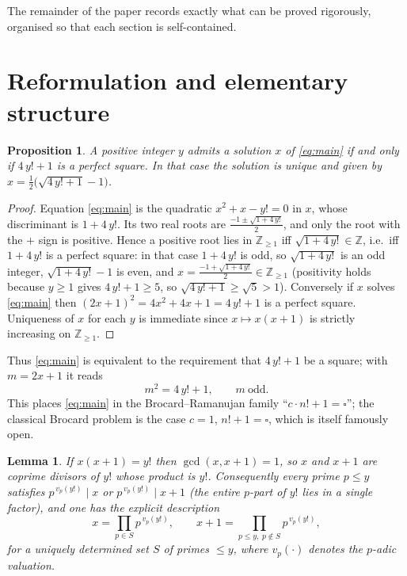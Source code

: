 \documentclass{amsart}
\theoremstyle{plain}
\newtheorem{proposition}{Proposition}
\newtheorem{lemma}{Lemma}
\theoremstyle{remark}
\begin{document}
The remainder of the paper records exactly what can be proved rigorously,
organised so that each section is self-contained.

\section{Reformulation and elementary structure}

\begin{proposition}\label{prop:square}
A positive integer $y$ admits a solution $x$ of \eqref{eq:main} if and only
if $4\,y!+1$ is a perfect square.  In that case the solution is unique and
given by $x=\tfrac{1}{2}\bigl(\sqrt{4\,y!+1}-1\bigr)$.
\end{proposition}

\begin{proof}
Equation \eqref{eq:main} is the quadratic $x^2+x-y!=0$ in $x$, whose
discriminant is $1+4\,y!$.  Its two real roots are
$\frac{-1\pm\sqrt{1+4\,y!}}{2}$, and only the root with the $+$ sign is
positive.  Hence a positive root lies in $\mathbb{Z}_{\ge1}$ iff
$\sqrt{1+4\,y!}\in\mathbb{Z}$, i.e.\ iff $1+4\,y!$ is a perfect square: in
that case $1+4\,y!$ is odd, so $\sqrt{1+4\,y!}$ is an odd integer,
$\sqrt{1+4\,y!}-1$ is even, and
$x=\frac{-1+\sqrt{1+4\,y!}}{2}\in\mathbb{Z}_{\ge 1}$ (positivity holds
because $y\ge1$ gives $4\,y!+1\ge5$, so $\sqrt{4\,y!+1}\ge\sqrt5>1$).
Conversely if $x$ solves \eqref{eq:main} then
$(2x+1)^2=4x^2+4x+1=4\,y!+1$ is a perfect square. Uniqueness of $x$ for each
$y$ is immediate since $x\mapsto x(x+1)$ is strictly increasing on
$\mathbb{Z}_{\ge 1}$.
\end{proof}

Thus \eqref{eq:main} is equivalent to the requirement that $4\,y!+1$ be a
square; with $m=2x+1$ it reads
\begin{equation}\label{eq:m}
   m^2=4\,y!+1,\qquad m\ \text{odd}.
\end{equation}
This places \eqref{eq:main} in the Brocard--Ramanujan family
``$c\cdot n!+1=\square$''; the classical Brocard problem is the case
$c=1$, $n!+1=\square$, which is itself famously open.

\begin{lemma}\label{lem:coprime}
If $x(x+1)=y!$ then $\gcd(x,x+1)=1$, so $x$ and $x+1$ are coprime divisors
of $y!$ whose product is $y!$.  Consequently every prime $p\le y$ satisfies
$p^{\,v_p(y!)}\mid x$ or $p^{\,v_p(y!)}\mid x+1$ (the entire $p$-part of $y!$
lies in a single factor), and one has the explicit description
\begin{equation}\label{eq:coprimedesc}
   x=\prod_{p\in S}p^{\,v_p(y!)},\qquad
   x+1=\prod_{p\le y,\;p\notin S}p^{\,v_p(y!)},
\end{equation}
for a uniquely determined set $S$ of primes $\le y$, where $v_p(\cdot)$
denotes the $p$-adic valuation.
\end{lemma}
\end{document}
